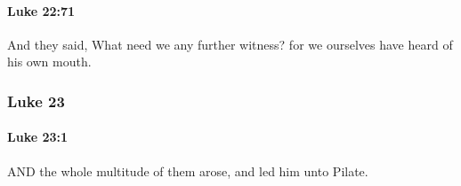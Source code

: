 		\paragraph{Luke 22:71} %
			\label{LUKE-22-71}

			And they said, What need we any further witness? for we ourselves have heard of his own mouth.

			\begin{framed}
			\scriptsize
				\begin{compactdesc}
					\item[SBLG] 
				\end{compactdesc}
			\end{framed}

	\subsubsection{Luke 23} %
		\label{LUKE-23}
		
		\paragraph{Luke 23:1} %
			\label{LUKE-23-1}

			AND the whole multitude of them arose, and led him unto Pilate.

